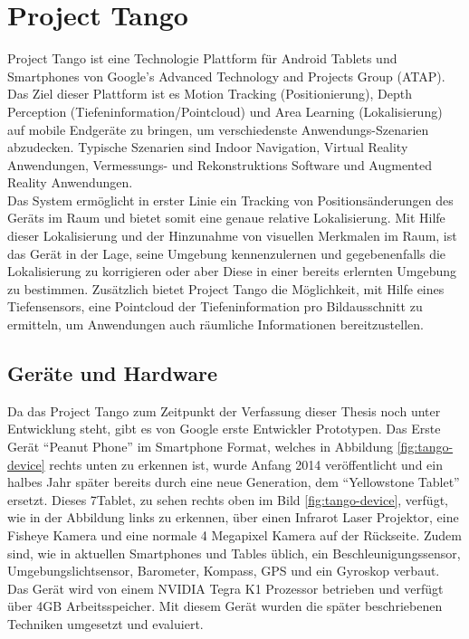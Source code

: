 
\section{Project Tango} \label{sec:theory_project_tango}

Project Tango ist eine Technologie Plattform für Android Tablets und Smartphones von Google’s Advanced Technology and Projects Group (ATAP). Das Ziel dieser Plattform ist es Motion Tracking (Positionierung), Depth Perception (Tiefeninformation/Pointcloud) und Area Learning (Lokalisierung) auf mobile Endgeräte zu bringen, um verschiedenste Anwendungs-Szenarien abzudecken. Typische Szenarien sind Indoor Navigation, Virtual Reality Anwendungen, Vermessungs- und Rekonstruktions Software und Augmented Reality Anwendungen.\\

Das System ermöglicht in erster Linie ein Tracking von Positionsänderungen des Geräts im Raum und bietet somit eine genaue relative Lokalisierung. Mit Hilfe dieser Lokalisierung und der Hinzunahme von visuellen Merkmalen im Raum, ist das Gerät in der Lage, seine Umgebung kennenzulernen und gegebenenfalls die Lokalisierung zu korrigieren oder aber Diese in einer bereits erlernten Umgebung zu bestimmen. Zusätzlich bietet Project Tango die Möglichkeit, mit Hilfe eines Tiefensensors, eine Pointcloud der Tiefeninformation pro Bildausschnitt zu ermitteln, um Anwendungen auch räumliche Informationen bereitzustellen.  \citep{Proje19:online} \\

\subsection{Geräte und Hardware}

Da das Project Tango zum Zeitpunkt der Verfassung dieser Thesis noch unter Entwicklung steht, gibt es von Google erste Entwickler Prototypen. Das Erste Gerät \enquote{Peanut Phone} im Smartphone Format, welches in Abbildung \ref{fig:tango-device} rechts unten zu erkennen ist, wurde Anfang 2014 veröffentlicht und ein halbes Jahr später bereits durch eine neue Generation, dem \enquote{Yellowstone Tablet} ersetzt. Dieses 7\dq Tablet, zu sehen rechts oben im Bild \ref{fig:tango-device}, verfügt, wie in der Abbildung links zu erkennen, über einen Infrarot Laser Projektor, eine Fisheye Kamera und eine normale 4 Megapixel Kamera auf der Rückseite. Zudem sind, wie in aktuellen Smartphones und Tables üblich, ein Beschleunigungssensor, Umgebungslichtsensor, Barometer, Kompass, GPS und ein Gyroskop verbaut. Das Gerät wird von einem NVIDIA Tegra K1 Prozessor betrieben und verfügt über 4GB Arbeitsspeicher. \citep{Proje19:online} Mit diesem Gerät wurden die später beschriebenen Techniken umgesetzt und evaluiert. \\

